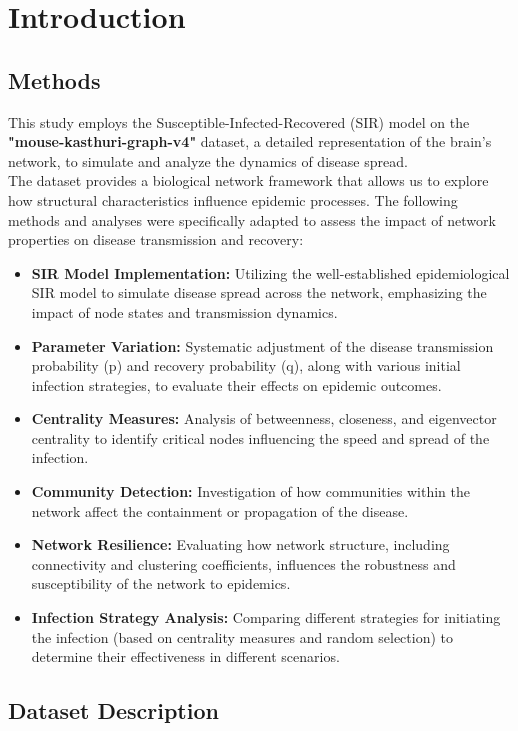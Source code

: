 \documentclass[
	report, %
	11pt, %
]{CSUniSchoolLabReport}
\newcounter{ct}
\begin{document}
\section{Introduction}
\subsection{Methods}
This study employs the Susceptible-Infected-Recovered (SIR) model on the \textbf{"mouse-kasthuri-graph-v4"} dataset, a detailed representation of the brain's network, to simulate and analyze the dynamics of disease spread.\\
The dataset provides a biological network framework that allows us to explore how structural characteristics influence epidemic processes. The following methods and analyses were specifically adapted to assess the impact of network properties on disease transmission and recovery:

\begin{itemize}
\item \textbf{SIR Model Implementation:} Utilizing the well-established epidemiological SIR model to simulate disease spread across the network, emphasizing the impact of node states and transmission dynamics.
\item \textbf{Parameter Variation:} Systematic adjustment of the disease transmission probability (p) and recovery probability (q), along with various initial infection strategies, to evaluate their effects on epidemic outcomes.
\item \textbf{Centrality Measures:} Analysis of betweenness, closeness, and eigenvector centrality to identify critical nodes influencing the speed and spread of the infection.
\item \textbf{Community Detection:} Investigation of how communities within the network affect the containment or propagation of the disease.
\item \textbf{Network Resilience:} Evaluating how network structure, including connectivity and clustering coefficients, influences the robustness and susceptibility of the network to epidemics.
\item \textbf{Infection Strategy Analysis:} Comparing different strategies for initiating the infection (based on centrality measures and random selection) to determine their effectiveness in different scenarios.
\end{itemize}

\subsection{Dataset Description}
\end{document}
